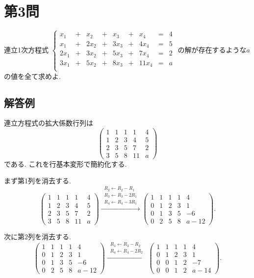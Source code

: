 \documentclass[uplatex,dvipdfmx,a4paper,14pt]{jsarticle}
\newcommand{\op}[1]{\xrightarrow{\ #1\ }}
\begin{document}
\section*{第3問}

\begin{tcolorbox}[problemstyle,title=問題]

連立1次方程式
$
 \left\{
\begin{matrix}
x_1& +& x_2 & + &x_3& + &x_4&= & 4\\
x_1&+&2x_2& +&3x_3&+&4x_4&= & 5\\
2x_1	&+ &3x_2& +&5x_3&+&7x_4&=&2 \\
3x_1&+&5x_2& +&8x_3&+&11x_4&= & a\\
\end{matrix}
\right.
 $
 の解が存在するような$a$の値を全て求めよ.

\end{tcolorbox}

\subsection*{解答例}

連立方程式の拡大係数行列は
\[
\left(
\begin{array}{cccc|c}
1&1&1&1&4\\
1&2&3&4&5\\
2&3&5&7&2\\
3&5&8&11&a
\end{array}
\right)
\]
である. これを行基本変形で簡約化する.

まず第1列を消去する.
\[
\left(
\begin{array}{cccc|c}
1&1&1&1&4\\
1&2&3&4&5\\
2&3&5&7&2\\
3&5&8&11&a
\end{array}
\right)
\op{\substack{R_2\leftarrow R_2-R_1\\ R_3\leftarrow R_3-2R_1\\ R_4\leftarrow R_4-3R_1}}
\left(
\begin{array}{cccc|c}
1&1&1&1&4\\
0&1&2&3&1\\
0&1&3&5&-6\\
0&2&5&8&a-12
\end{array}
\right).
\]

次に第2列を消去する.
\[
\left(
\begin{array}{cccc|c}
1&1&1&1&4\\
0&1&2&3&1\\
0&1&3&5&-6\\
0&2&5&8&a-12
\end{array}
\right)
\op{\substack{R_3\leftarrow R_3-R_2\\ R_4\leftarrow R_4-2R_2}}
\left(
\begin{array}{cccc|c}
1&1&1&1&4\\
0&1&2&3&1\\
0&0&1&2&-7\\
0&0&1&2&a-14
\end{array}
\right).
\]
\end{document}
